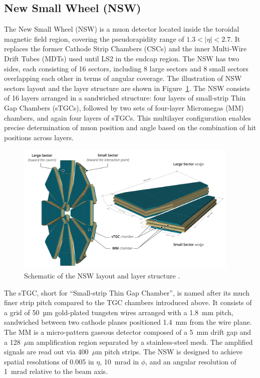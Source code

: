 \subsection{New Small Wheel (NSW)}
The New Small Wheel (NSW) is a muon detector located inside the toroidal magnetic field region, covering the pseudorapidity range of $1.3 < |\eta| < 2.7$. It replaces the former Cathode Strip Chambers (CSCs) and the inner Multi-Wire Drift Tubes (MDTs) used until LS2 in the endcap region. The NSW has two sides, each consisting of 16 sectors, including 8 large sectors and 8 small sectors overlapping each other in terms of angular coverage. The illustration of NSW sectors layout and the layer structure are shown in Figure~\ref{fig:NSW}. The NSW consists of 16 layers arranged in a sandwiched structure: four layers of small-strip Thin Gap Chambers (sTGCs), followed by two sets of four-layer Micromegas (MM) chambers, and again four layers of sTGCs. This multilayer configuration enables precise determination of muon position and angle based on the combination of hit positions across layers.

\begin{figure}[htbp]
  \centering
  \includegraphics[width=0.95\textwidth]{figs/chapter2/NSW.png}
  \caption{Schematic of the NSW layout and layer structure \cite{ATLASRun3Detector}.}
  \label{fig:NSW}
\end{figure}

The sTGC, short for ``Small-strip Thin Gap Chamber'', is named after its much finer strip pitch compared to the TGC chambers introduced above. It consists of a grid of 50~µm gold-plated tungsten wires arranged with a 1.8~mm pitch, sandwiched between two cathode planes positioned 1.4~mm from the wire plane. The MM is a micro-pattern gaseous detector composed of a 5~mm drift gap and a 128~$\mu$m amplification region separated by a stainless-steel mesh. The amplified signals are read out via 400~$\mu$m pitch strips. The NSW is designed to achieve spatial resolutions of 0.005 in $\eta$, 10~mrad in $\phi$, and an angular resolution of 1~mrad relative to the beam axis.

